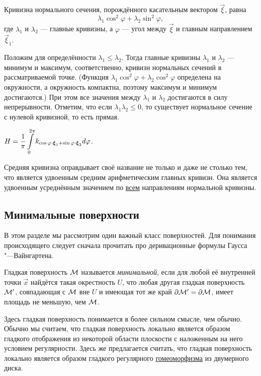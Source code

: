 \begin{theorem} \label{theorem:EulerFormula}
	Кривизна нормального сечения, порождённого касательным вектором $\vec{\xi}$, равна
	\[
		\lambda_1\cos^2\varphi + \lambda_2\sin^2\varphi,
	\]
	где $\lambda_1$ и $\lambda_2$ --- главные кривизны, а $\varphi$ --- угол между $\vec{\xi}$ и главным направлением $\vec{\xi}_1$.
\end{theorem}

Положим для определённости $\lambda_1 \leqslant \lambda_2$. Тогда главные кривизны $\lambda_1$ и $\lambda_2$ --- минимум и максимум, соответственно, кривизн нормальных сечений в рассматриваемой точке. (Функция $\lambda_1\cos^2\varphi + \lambda_2\cos^2\varphi$ определена на окружности, а окружность компактна, поэтому максимум и минимум достигаются.) При этом все значения между $\lambda_1$ и $\lambda_2$ достигаются в силу непрерывности. Отметим, что если $\lambda_1\lambda_2 \leqslant 0$, то существует нормальное сечение с нулевой кривизной, то есть прямая.

\begin{corollary}
	$\displaystyle H = \frac{1}{\pi}\int\limits_0^{2\pi}k_{\cos\varphi \cdot \boldsymbol{\xi}_1 + \sin\varphi \cdot \boldsymbol{\xi}_2}d\varphi$.
\end{corollary}

Средняя кривизна оправдывает своё название не только и даже не столько тем, что является удвоенным средним арифметическим главных кривизн. Она является удвоенным усреднённым значением по \underline{всем} направлениям нормальной кривизны.

\subsection{Минимальные поверхности}

В этом разделе мы рассмотрим один важный класс поверхностей. Для понимания происходящего следует сначала прочитать про деривационные формулы Гаусса "---Вайнгартена.

\begin{definition}
	Гладкая поверхность $\mathcal{M}$ называется \textit{минимальной}, если для любой её внутренней точки $\vec{x}$ найдётся такая окрестность $U$, что любая другая гладкая поверхность $\mathcal{M}^\prime$, совпадающая с $\mathcal{M}$ вне $U$ и имеющая тот же край $\partial\mathcal{M}^\prime = \partial\mathcal{M}$, имеет площадь не меньшую, чем $\mathcal{M}$.
\end{definition}

Здесь гладкая поверхность понимается в более сильном смысле, чем обычно. Обычно мы считаем, что гладкая поверхность локально является образом гладкого отображения из некоторой области плоскости с наложенным на него условием регулярности. Здесь же предлагается считать, что гладкая поверхность локально является образом гладкого регулярного \underline{гомеоморфизма} из двумерного диска.

